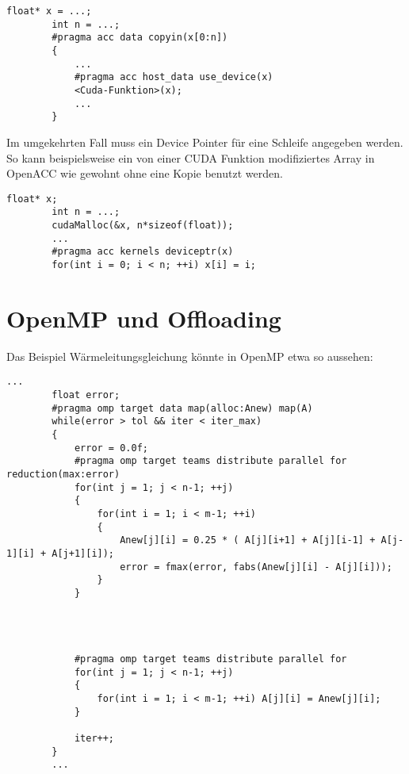 		\newpage
		
		\begin{lstlisting}[caption=OpenACC/CUDA Zusammenspiel: Host Memory]
		float* x = ...;
		int n = ...;
		#pragma acc data copyin(x[0:n])
		{
			...
			#pragma acc host_data use_device(x)
			<Cuda-Funktion>(x);
			...
		}
		\end{lstlisting}

		Im umgekehrten Fall muss ein Device Pointer für eine Schleife angegeben werden. So kann beispielsweise ein von einer CUDA Funktion modifiziertes Array in OpenACC wie gewohnt ohne eine Kopie benutzt werden.
		
		\begin{lstlisting}[caption=OpenACC/CUDA Zusammenspiel: Device Memory]
		float* x;
		int n = ...;
		cudaMalloc(&x, n*sizeof(float));
		...
		#pragma acc kernels deviceptr(x)
		for(int i = 0; i < n; ++i) x[i] = i;
		\end{lstlisting}
			
		\section{OpenMP und Offloading}
		Das Beispiel Wärmeleitungsgleichung könnte in OpenMP etwa so aussehen:
		
		\begin{lstlisting}[caption=OpenMP: Offloading]
		...
		float error;
		#pragma omp target data map(alloc:Anew) map(A)
		while(error > tol && iter < iter_max)
		{
			error = 0.0f;
			#pragma omp target teams distribute parallel for reduction(max:error)
			for(int j = 1; j < n-1; ++j)
			{
				for(int i = 1; i < m-1; ++i)
				{
					Anew[j][i] = 0.25 * ( A[j][i+1] + A[j][i-1] + A[j-1][i] + A[j+1][i]);
					error = fmax(error, fabs(Anew[j][i] - A[j][i]));
				}
			}
			
			
			
			
			#pragma omp target teams distribute parallel for
			for(int j = 1; j < n-1; ++j)
			{
				for(int i = 1; i < m-1; ++i) A[j][i] = Anew[j][i];
			}
			
			iter++;
		}
		...
		\end{lstlisting}
